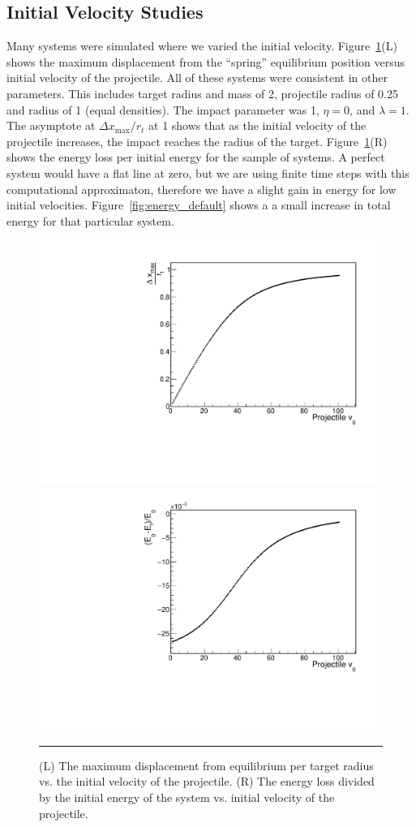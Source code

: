 \documentclass[aps,prl,floatfix,preprint,nofootinbib]{revtex4}
\begin{document}
\subsection{Initial Velocity Studies}
Many systems were simulated where we varied the initial velocity. Figure~\ref{fig:changing_pvinit1}(L) shows the maximum displacement from the ``spring'' equilibrium position versus initial velocity of the projectile. All of these systems were consistent in other parameters. This includes target radius and mass of 2, projectile radius of 0.25 and radius of 1 (equal densities). The impact parameter was 1, $\eta = 0$, and $\lambda = 1$. The asymptote at $\Delta x_{\text{max}}/r_t$ at 1 shows that as the initial velocity of the projectile increases, the impact reaches the radius of the target. Figure~\ref{fig:changing_pvinit1}(R) shows the energy loss per initial energy for the sample of systems. A perfect system would have a flat line at zero, but we are using finite time steps with this computational approximaton, therefore we have a slight gain in energy for low initial velocities. Figure~\ref{fig:energy_default} shows a a small increase in total energy for that particular system.
\begin{figure}[floatfix]
  \includegraphics[width=.45\linewidth]{plots/trend_plots/dxmax_vs_pvinit.pdf}
  \includegraphics[width=.45\linewidth]{plots/trend_plots/Eloss_vs_pvinit.pdf}
                  {\par\nobreak\rule[9pt]{35em}{0.5pt}\vspace{-5mm}}
                  \caption{(L) The maximum displacement from equilibrium per target radius vs. the initial velocity of the projectile. (R) The energy loss divided by the initial energy of the system vs. initial velocity of the projectile.}
                  \label{fig:changing_pvinit1}
\end{figure}
\end{document}
